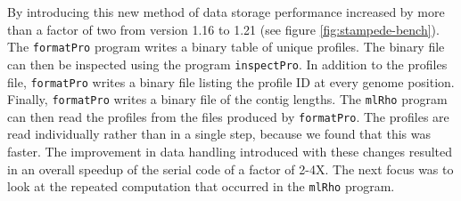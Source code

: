 \documentclass{sig-alternate}
\newcommand{\ty}{\texttt}
\begin{document}
By introducing this new method of data storage performance increased by more than a factor of two from version
1.16 to 1.21 (see figure \ref{fig:stampede-bench}). The \ty{formatPro} program writes a binary table of unique
profiles.
The binary file can then be inspected using the program \ty{inspectPro}.
In addition to the profiles file, \ty{formatPro} writes a binary file
listing the profile ID at every genome position.
Finally, \ty{formatPro} writes a binary file of the contig lengths.
The \ty{mlRho} program can then read the profiles from the files produced by \ty{formatPro}.
The profiles are read individually rather than in a single
step, because we found that this was
faster. The improvement in data handling introduced with these changes resulted in an overall speedup of the
serial code of a factor of 2-4X. The next focus was to look at the repeated computation that occurred in the
\ty{mlRho} program. 
\end{document}
